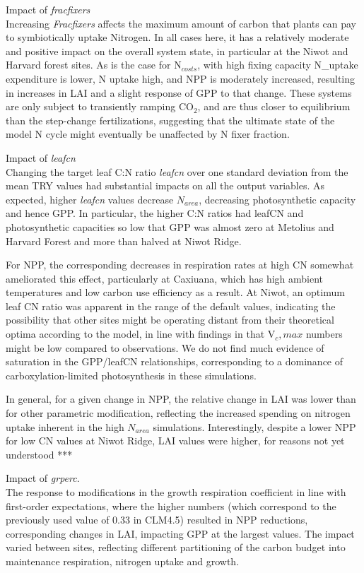 \documentclass[draft,linenumbers]{agujournal}
\begin{document}
Impact of \emph{fracfixers}\\
Increasing \emph{Fracfixers} affects the maximum amount of carbon that plants can pay to symbiotically uptake Nitrogen. In all cases here, it has a relatively moderate and positive impact on the overall system state, in particular at the Niwot and Harvard forest sites. As is the case for N$_{costs}$, with high fixing capacity N\_uptake expenditure is lower, N uptake high, and NPP is moderately increased, resulting in increases in LAI and a slight response of GPP to that change.  These systems are only subject to transiently ramping CO$_{2}$, and are thus closer to equilibrium than the step-change fertilizations, suggesting that the ultimate state of the model N cycle might eventually be unaffected by N fixer fraction. 

Impact of \emph{leafcn}\\
Changing the target leaf C:N ratio \emph{leafcn} over one standard deviation from the mean TRY values had substantial impacts on all the output variables.  As expected, higher \emph{leafcn} values decrease $N_{area}$, decreasing photosynthetic capacity and hence GPP.  In particular, the higher C:N ratios had leafCN and photosynthetic capacities so low that GPP was almost zero at Metolius and Harvard Forest and more than halved at Niwot Ridge.   

For NPP, the corresponding  decreases in respiration rates at high CN somewhat ameliorated this effect, particularly at Caxiuana, which has high ambient temperatures and low carbon use efficiency as a result.  At Niwot, an optimum leaf CN ratio was apparent in the range of the default values, indicating the possibility that other sites might be operating distant from their theoretical optima according to the model, in line with findings in \cite{lawrence} that V${_c,max}$ numbers might be low compared to observations. We do not find much evidence of saturation in the GPP/leafCN relationships, corresponding to a dominance of carboxylation-limited photosynthesis in these simulations. 

In general, for a given change in NPP, the relative change in LAI was lower than for other parametric modification, reflecting the increased spending on nitrogen uptake inherent in the high $N_{area}$ simulations. Interestingly, despite a lower NPP for low CN values at Niwot Ridge, LAI values were higher, for reasons not yet understood ***


Impact of \emph{grperc}.\\
The response to modifications in the growth respiration coefficient in line with first-order expectations, where the higher numbers (which correspond to the previously used value of 0.33 in CLM4.5) resulted in  NPP reductions, corresponding changes in LAI, impacting GPP at the largest values.   The impact varied between sites, reflecting different partitioning of the carbon budget into maintenance respiration, nitrogen uptake and growth. 
\end{document}
